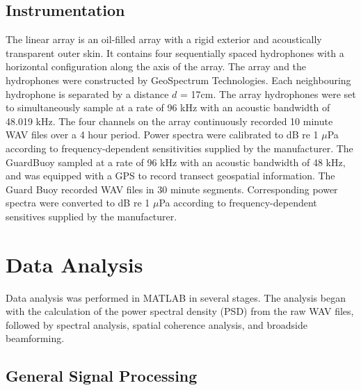 \documentclass[12pt,journal,onecolumn]{IEEEtran}
\begin{document}
\subsection{Instrumentation}
The linear array is an oil-filled array with a rigid exterior and acoustically transparent outer skin. It contains four sequentially spaced hydrophones with a horizontal configuration along the axis of the array. The array and the hydrophones were constructed by GeoSpectrum Technologies. Each neighbouring hydrophone is separated by a distance $d$ = 17cm. The array hydrophones were set to simultaneously sample at a rate of 96 kHz with an acoustic bandwidth of 48.019 kHz.
The four channels on the array continuously recorded 10 minute WAV files over a 4 hour period. Power spectra were calibrated to dB re 1 $\mu$Pa according to frequency-dependent sensitivities supplied by the manufacturer.
The GuardBuoy sampled at a rate of 96 kHz with an acoustic bandwidth of 48 kHz, and was equipped with a GPS to record transect geospatial information. The Guard Buoy recorded WAV files in 30 minute segments. Corresponding power spectra were converted to dB re 1 $\mu$Pa according to frequency-dependent sensitives supplied by the manufacturer. 
\section{Data Analysis}
\label{III}
Data analysis was performed in MATLAB in several stages. The analysis began with the calculation of the power spectral density (PSD) from the raw WAV files, followed by spectral analysis, spatial coherence analysis, and broadside beamforming. %



\subsection{General Signal Processing}
\end{document}
